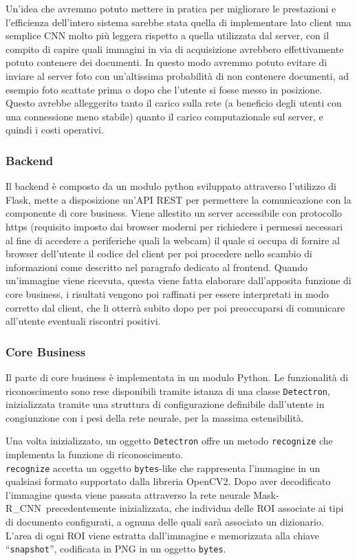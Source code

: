\documentclass[12pt,a4paper]{article}
\newcommand{\mrcnn}{Mask-R\_CNN}
\begin{document}
Un'idea che avremmo potuto mettere in pratica per migliorare le
prestazioni e l'efficienza dell'intero sistema sarebbe stata quella di
implementare lato client una semplice CNN molto più leggera rispetto a
quella utilizzata dal server, con il compito di capire quali immagini in
via di acquisizione avrebbero effettivamente potuto contenere dei
documenti. In questo modo avremmo potuto evitare di inviare al server
foto con un'altissima probabilità di non contenere documenti, ad esempio
foto scattate prima o dopo che l'utente si fosse messo in posizione.
Questo avrebbe alleggerito tanto il carico sulla rete (a beneficio degli
utenti con una connessione meno stabile) quanto il carico computazionale
sul server, e quindi i costi operativi.

\subsubsection{Backend}

Il backend è composto da un modulo python sviluppato attraverso l'utilizzo di Flask,
mette a disposizione un'API REST per permettere la
comunicazione con la componente di core business. Viene
allestito un server accessibile con protocollo https (requisito imposto dai
browser moderni per richiedere i permessi necessari al fine di accedere
a periferiche quali la webcam) il quale si occupa di fornire al browser
dell'utente il codice del client per poi procedere nello scambio di
informazioni come descritto nel paragrafo dedicato al frontend. Quando
un'immagine viene ricevuta, questa viene fatta elaborare dall'apposita
funzione di core business, i risultati vengono poi raffinati per essere
interpretati in modo corretto dal client, che li otterrà subito dopo
per poi preoccuparsi di comunicare all'utente eventuali riscontri positivi.

\subsubsection{Core Business}

Il parte di core business è implementata in un modulo Python. Le
funzionalità di riconoscimento sono rese disponibili tramite istanza di
una classe \texttt{Detectron}, inizializzata tramite una struttura di
configurazione definibile dall'utente in congiunzione con i pesi della
rete neurale, per la massima estensibilità.

Una volta inizializzato, un oggetto \texttt{Detectron} offre un metodo
\texttt{recognize} che implementa la funzione di riconoscimento.\\
\texttt{recognize} accetta un oggetto \texttt{bytes}-like che
rappresenta l'immagine in un qualsiasi formato supportato dalla libreria
OpenCV2. Dopo aver decodificato l'immagine questa viene passata
attraverso la rete neurale \mrcnn\ precedentemente inizializzata, che
individua delle ROI associate ai tipi di documento configurati, a ognuna
delle quali sarà associato un dizionario. L'area di ogni ROI viene
estratta dall'immagine e memorizzata alla chiave ``\texttt{snapshot}'',
codificata in PNG in un oggetto \texttt{bytes}.
\end{document}
